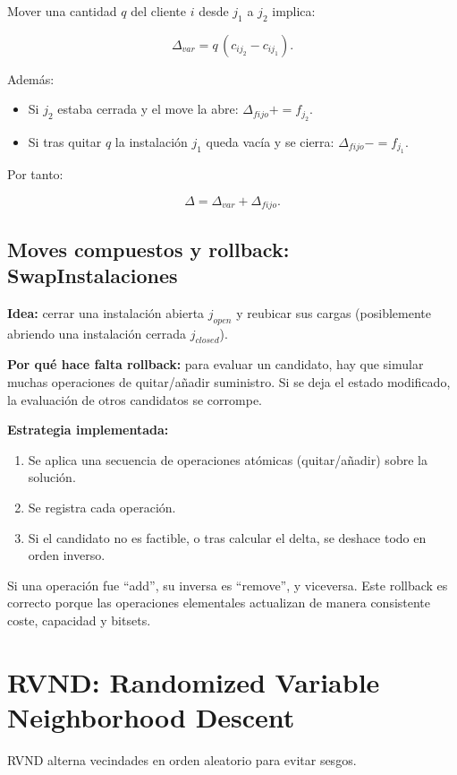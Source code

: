 \documentclass[12pt, a4paper]{report}
\begin{document}
Mover una cantidad $q$ del cliente $i$ desde $j_1$ a $j_2$ implica:

\[
\Delta_{var} = q\,(c_{i j_2} - c_{i j_1}).
\]

Además:

\begin{itemize}
  \item Si $j_2$ estaba cerrada y el move la abre: $\Delta_{fijo} += f_{j_2}$.
  \item Si tras quitar $q$ la instalación $j_1$ queda vacía y se cierra: $\Delta_{fijo} -= f_{j_1}$.
\end{itemize}

Por tanto:

\[
\Delta = \Delta_{var} + \Delta_{fijo}.
\]

\subsection{Moves compuestos y rollback: SwapInstalaciones}

\textbf{Idea:} cerrar una instalación abierta $j_{open}$ y reubicar sus cargas (posiblemente abriendo una instalación cerrada $j_{closed}$).

\textbf{Por qué hace falta rollback:} para evaluar un candidato, hay que simular muchas operaciones de quitar/añadir suministro. Si se deja el estado modificado, la evaluación de otros candidatos se corrompe.

\textbf{Estrategia implementada:}

\begin{enumerate}
  \item Se aplica una secuencia de operaciones atómicas (quitar/añadir) sobre la solución.
  \item Se registra cada operación.
  \item Si el candidato no es factible, o tras calcular el delta, se deshace todo en orden inverso.
\end{enumerate}

Si una operación fue “add”, su inversa es “remove”, y viceversa. Este rollback es correcto porque las operaciones elementales actualizan de manera consistente coste, capacidad y bitsets.

\section{RVND: Randomized Variable Neighborhood Descent}

RVND alterna vecindades en orden aleatorio para evitar sesgos.
\end{document}
